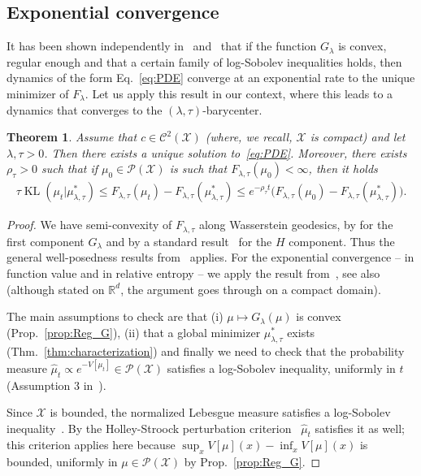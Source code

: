 \documentclass[11pt]{article}
\newcommand{\RR}{\mathbb{R}}
\newcommand{\Cc}{\mathcal{C}}
\newcommand{\Pp}{\mathcal{P}}
\newcommand{\Xx}{\mathcal{X}}
\DeclareMathOperator{\KL}{KL}
\newtheorem{theorem}{Theorem}[section]
\begin{document}
\subsection{Exponential convergence}
It has been shown independently in~\cite{nitanda2022convex} and~\cite{chizat2022mean} that if the function $G_\lambda$ is convex, regular enough and that a certain family of log-Sobolev inequalities holds, then dynamics of the form Eq.~\eqref{eq:PDE} converge at an exponential rate  to the unique minimizer of $F_{\lambda}$. Let us apply this result in our context, where this leads to a dynamics that converges to the $(\lambda,\tau)$-barycenter.
\begin{assbox}
\begin{theorem}\label{thm:global-convergence}
Assume that $c\in \Cc^2(\Xx)$ (where, we recall, $\Xx$ is compact) and let $\lambda,\tau>0$. Then there exists a unique solution to~\eqref{eq:PDE}. Moreover, there exists $\rho_\tau>0$ such that if $\mu_0\in \Pp(\Xx)$ is such that $F_{\lambda,\tau}(\mu_0)<\infty$, then it holds 
\begin{align*}
\tau \KL(\mu_t|\mu^*_{\lambda,\tau})\leq F_{\lambda,\tau}(\mu_t) - F_{\lambda,\tau}(\mu^*_{\lambda,\tau})\leq e^{-\rho_\tau t} \big( F_{\lambda,\tau}(\mu_0) - F_{\lambda,\tau}(\mu^*_{\lambda,\tau}) \big).
\end{align*}
\end{theorem}
\end{assbox}
\begin{proof}
We have semi-convexity of $F_{\lambda,\tau}$ along Wasserstein geodesics, by \cite[Thm.~4.1]{carlier2024displacement} for the first component $G_\lambda$ and by a standard result~\cite{santambrogio2015optimal} for the  $H$ component. Thus the general well-posedness results from~\cite{ambrosio2005gradient} applies. For the exponential convergence -- in function value and in relative entropy -- we apply the result from~\cite[Thm. 3.2]{chizat2022mean}, see also~\cite{nitanda2022convex} (although stated on $\RR^d$, the argument goes through on a compact domain). 

The main assumptions to check are that (i) $\mu\mapsto G_\lambda(\mu)$ is convex (Prop.~\ref{prop:Reg_G}), (ii) that a global minimizer $\mu^*_{\lambda,\tau}$ exists (Thm.~\ref{thm:characterization}) and finally we need to check that the probability measure $\hat \mu_t \propto e^{-V[\mu_t]} \in \Pp(\Xx)$ satisfies a log-Sobolev inequality, uniformly in $t$ (Assumption 3 in~\cite{chizat2022mean}). 

Since $\Xx$ is bounded, the normalized Lebesgue measure satisfies a log-Sobolev inequality~\cite[Thm.~7.3]{ledoux1999concentration}. By the Holley-Stroock perturbation criterion~\cite{holley1986logarithmic} $\hat \mu_t$ satisfies it as well; this criterion applies here because $\sup_x V[\mu](x)- \inf_x V[\mu](x)$ is bounded, uniformly in $\mu\in \Pp(\Xx)$ by Prop.~\ref{prop:Reg_G}. 
\end{proof}
\end{document}
